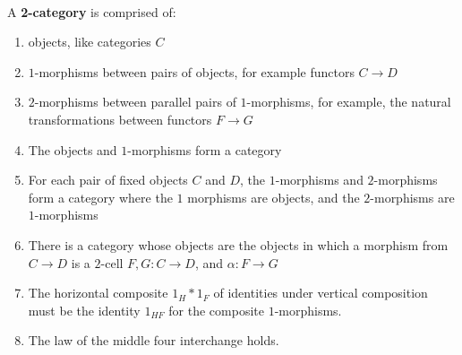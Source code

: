 \documentclass{article}
\begin{document}
\begin{definition}[2-category]
\

A \textbf{2-category} is comprised of:

\begin{enumerate}
    \item objects, like categories $C$
    \item $1$-morphisms between pairs of objects, for example functors $C \to D$
    \item $2$-morphisms between parallel pairs of $1$-morphisms, for example, the natural transformations between functors $F \to G$
    \item The objects and $1$-morphisms form a category
    \item For each pair of fixed objects $C$ and $D$, the $1$-morphisms and $2$-morphisms form a category where the $1$ morphisms are objects, and the $2$-morphisms are $1$-morphisms
    \item There is a category whose objects are the objects in which a morphism from $C \to D$ is a $2$-cell $F, G: C\to D$, and $\alpha: F \to G$
    \item The horizontal composite $1_H * 1_F$ of identities under vertical composition must be the identity $1_{HF}$ for the composite $1$-morphisms.
    \item The law of the middle four interchange holds.
\end{enumerate}
\end{definition}
\end{document}
